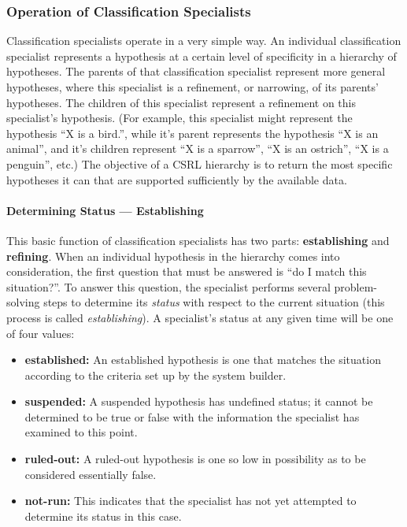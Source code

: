 \subsubsection{Operation of Classification Specialists}

Classification specialists operate in a very simple way.  An
individual classification specialist represents a hypothesis at a
certain level of specificity in a hierarchy of hypotheses. The parents
of that classification specialist represent more general hypotheses,
where this specialist is a refinement, or narrowing, of its parents'
hypotheses. The children of this specialist represent a refinement on
this specialist's hypothesis.  (For example, this specialist might
represent the hypothesis ``X is a bird.'', while it's parent
represents the hypothesis ``X is an animal'', and it's children
represent ``X is a sparrow'', ``X is an ostrich'', ``X is a penguin'',
etc.) The objective of a CSRL hierarchy is to return the most specific
hypotheses it can that are supported sufficiently by the available
data.

\paragraph{Determining Status --- Establishing}

This basic function of classification specialists has two parts: {\bf
establishing} and {\bf refining}. When an individual hypothesis in the
hierarchy comes into consideration, the first question that must be
answered is ``do I match this situation?''. To answer this question,
the specialist performs several problem-solving steps to determine its
{\it status} with respect to the current situation (this process is
called {\it establishing\/}). A specialist's status at any given time
will be one of four values:
\begin{itemize}
\item {\bf established:} An established hypothesis is one that matches the
situation according to the criteria set up by the system builder.
\item {\bf suspended:} A suspended hypothesis has undefined status; it
cannot be determined to be true or false with the information the
specialist has examined to this point.
\item {\bf ruled-out:} A ruled-out hypothesis is one so low in
possibility as to be considered essentially false.
\item {\bf not-run:} This indicates that the specialist has not yet
attempted to determine its status in this case.
\end{itemize}

